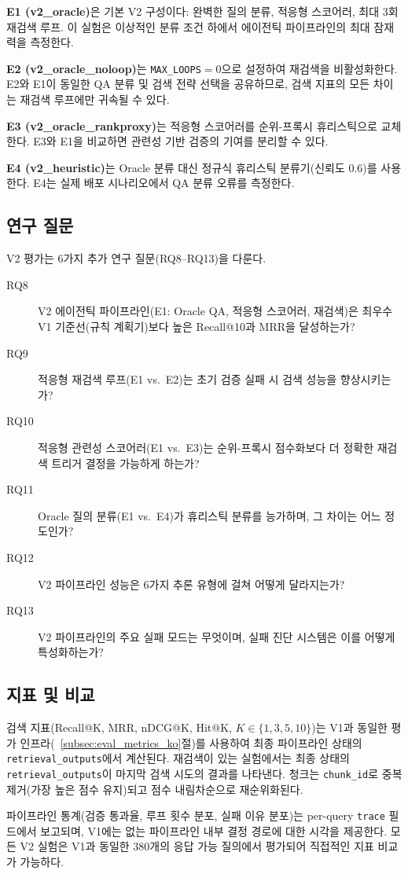 \textbf{E1 (v2\_oracle)}은 기본 V2 구성이다: 완벽한 질의 분류, 적응형 스코어러, 최대 3회 재검색 루프. 이 실험은 이상적인 분류 조건 하에서 에이전틱 파이프라인의 최대 잠재력을 측정한다.

\textbf{E2 (v2\_oracle\_noloop)}는 \texttt{MAX\_LOOPS}$=0$으로 설정하여 재검색을 비활성화한다. E2와 E1이 동일한 QA 분류 및 검색 전략 선택을 공유하므로, 검색 지표의 모든 차이는 재검색 루프에만 귀속될 수 있다.

\textbf{E3 (v2\_oracle\_rankproxy)}는 적응형 스코어러를 순위-프록시 휴리스틱으로 교체한다. E3와 E1을 비교하면 관련성 기반 검증의 기여를 분리할 수 있다.

\textbf{E4 (v2\_heuristic)}는 Oracle 분류 대신 정규식 휴리스틱 분류기(신뢰도 0.6)를 사용한다. E4는 실제 배포 시나리오에서 QA 분류 오류를 측정한다.

\subsection{연구 질문}
\label{subsec:v2_rqs_ko}

V2 평가는 6가지 추가 연구 질문(RQ8--RQ13)을 다룬다.

\begin{description}
  \item[RQ8] V2 에이전틱 파이프라인(E1: Oracle QA, 적응형 스코어러, 재검색)은 최우수 V1 기준선(규칙 계획기)보다 높은 Recall@10과 MRR을 달성하는가?
  \item[RQ9] 적응형 재검색 루프(E1 vs.\ E2)는 초기 검증 실패 시 검색 성능을 향상시키는가?
  \item[RQ10] 적응형 관련성 스코어러(E1 vs.\ E3)는 순위-프록시 점수화보다 더 정확한 재검색 트리거 결정을 가능하게 하는가?
  \item[RQ11] Oracle 질의 분류(E1 vs.\ E4)가 휴리스틱 분류를 능가하며, 그 차이는 어느 정도인가?
  \item[RQ12] V2 파이프라인 성능은 6가지 추론 유형에 걸쳐 어떻게 달라지는가?
  \item[RQ13] V2 파이프라인의 주요 실패 모드는 무엇이며, 실패 진단 시스템은 이를 어떻게 특성화하는가?
\end{description}

\subsection{지표 및 비교}
\label{subsec:v2_metrics_ko}

검색 지표(Recall@K, MRR, nDCG@K, Hit@K, $K \in \{1,3,5,10\}$)는 V1과 동일한 평가 인프라(~\ref{subsec:eval_metrics_ko}절)를 사용하여 최종 파이프라인 상태의 \texttt{retrieval\_outputs}에서 계산된다. 재검색이 있는 실험에서는 최종 상태의 \texttt{retrieval\_outputs}이 마지막 검색 시도의 결과를 나타낸다. 청크는 \texttt{chunk\_id}로 중복 제거(가장 높은 점수 유지)되고 점수 내림차순으로 재순위화된다.

파이프라인 통계(검증 통과율, 루프 횟수 분포, 실패 이유 분포)는 per-query \texttt{trace} 필드에서 보고되며, V1에는 없는 파이프라인 내부 결정 경로에 대한 시각을 제공한다. 모든 V2 실험은 V1과 동일한 380개의 응답 가능 질의에서 평가되어 직접적인 지표 비교가 가능하다.
